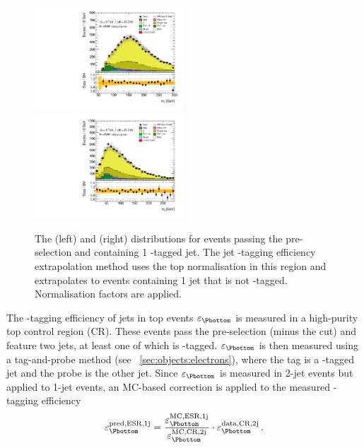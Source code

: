 \begin{figure}[t]
	\includegraphics[width=0.495\textwidth]{tex/backgrounds/emme_CutMTW_1j_noSubBjet_Btagged_MT_TrackHWW_Clj_mh125_lin}
	\hfill
	\includegraphics[width=0.495\textwidth]{tex/backgrounds/emme_CutMTW_1j_noSubBjet_Btagged_Mll_mh125_lin}
	\caption{The \mt (left) and \mll (right) distributions for events passing the 
	pre-selection and containing 1 \Pbottom-tagged jet. The jet \Pbottom-tagging 
	efficiency extrapolation method uses the top normalisation in this region and 
	extrapolates to events containing 1 jet that is not \Pbottom-tagged. Normalisation 
	factors are applied.}
	\label{fig:top:jbee}
\end{figure}

The \Pbottom-tagging efficiency of jets in top events $\varepsilon_{\Pbottom}$ is measured 
in a high-purity top control region (CR). These events pass the pre-selection (minus the 
\corrtrackmet cut) and feature two jets, at least one of which is \Pbottom-tagged. 
$\varepsilon_{\Pbottom}$ is then measured using a tag-and-probe method (see 
\Section~\ref{sec:objects:electrons}), where the tag is a 
\Pbottom-tagged jet and the probe is the other jet. Since $\varepsilon_{\Pbottom}$ is 
measured in 2-jet events but applied to 1-jet events, an MC-based correction is applied to 
the measured \Pbottom-tagging efficiency
\begin{equation}
	\varepsilon_{\Pbottom}^{\text{pred,ESR,1j}} = \frac{\varepsilon_{\Pbottom}^{\text{MC,ESR,1j}}}{\varepsilon_{\Pbottom}^{\text{MC,CR,2j}}} \cdot \varepsilon_{\Pbottom}^{\text{data,CR,2j}} \,.
	\label{eq:top:jbee}
\end{equation}

